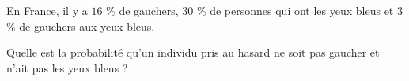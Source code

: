 \begin{exo}
	En France, il y a $16$ \% de gauchers, $30$ \% de personnes qui ont les yeux bleus et $3$ \% de gauchers aux yeux bleus.

	Quelle est la probabilité qu'un individu pris au hasard ne soit pas gaucher et n'ait pas les yeux bleus ?
\end{exo}
